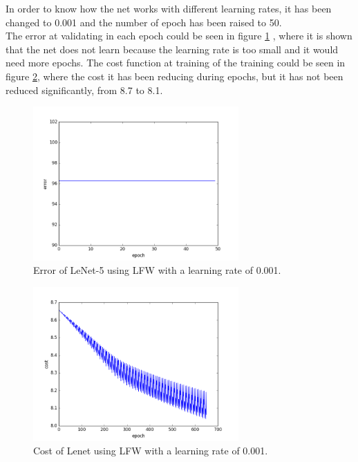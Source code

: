 In order to know how the net works with different learning rates, it has been changed to 0.001 and the number of epoch has been raised to 50.\\

The error at validating in each epoch could be seen in figure \ref{fig:LENETLFWerror0-001} , where it is shown that the net does not learn because the learning rate is too small and it would need more epochs. The cost function at training of the training could be seen in figure \ref{fig:LENETLFWcost0-001}, where the cost it has been reducing during epochs, but it has not been reduced significantly, from 8.7 to 8.1.\\

\begin{figure}[htb]
\centering
\includegraphics[width=0.7\textwidth]{images/LFW_learningrate/error_0_001.png}
\caption{Error of LeNet-5 using LFW with a learning rate of 0.001.} \label{fig:LENETLFWerror0-001}
\end{figure}

\begin{figure}[htb]
\centering
\includegraphics[width=0.7\textwidth]{images/LFW_learningrate/cost_0_001.png}
\caption{Cost of Lenet using LFW with a learning rate of 0.001.} \label{fig:LENETLFWcost0-001}
\end{figure}

